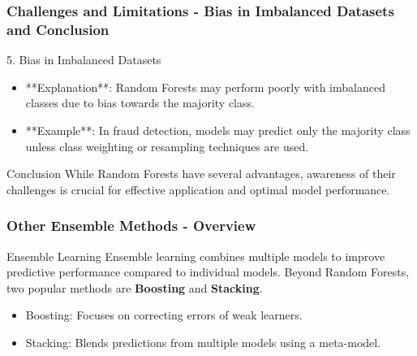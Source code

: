 \documentclass[aspectratio=169]{beamer}
\begin{document}
\begin{frame}[fragile]
    \frametitle{Challenges and Limitations - Bias in Imbalanced Datasets and Conclusion}
    \begin{block}{5. Bias in Imbalanced Datasets}
        \begin{itemize}
            \item **Explanation**: Random Forests may perform poorly with imbalanced classes due to bias towards the majority class.
            \item **Example**: In fraud detection, models may predict only the majority class unless class weighting or resampling techniques are used.
        \end{itemize}
    \end{block}

    \begin{block}{Conclusion}
        While Random Forests have several advantages, awareness of their challenges is crucial for effective application and optimal model performance.
    \end{block}
\end{frame}

\begin{frame}[fragile]
    \frametitle{Other Ensemble Methods - Overview}
    \begin{block}{Ensemble Learning}
        Ensemble learning combines multiple models to improve predictive performance compared to individual models. Beyond Random Forests, two popular methods are \textbf{Boosting} and \textbf{Stacking}.
    \end{block}

    \begin{itemize}
        \item Boosting: Focuses on correcting errors of weak learners.
        \item Stacking: Blends predictions from multiple models using a meta-model.
    \end{itemize}
\end{frame}
\end{document}
